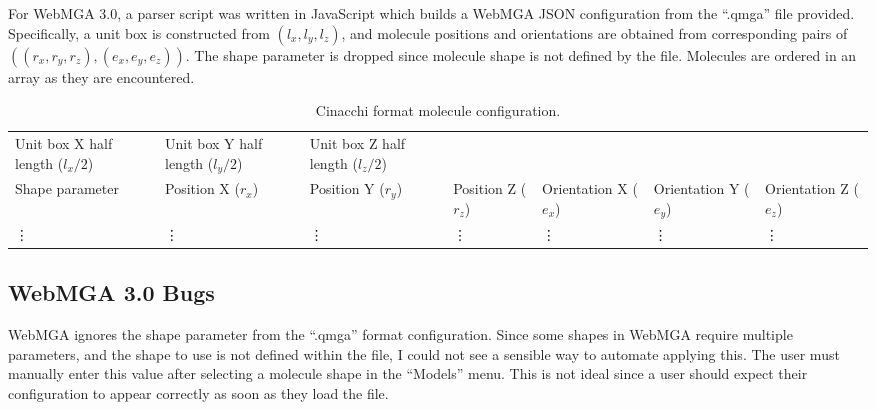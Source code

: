For WebMGA 3.0, a parser script was written in JavaScript which builds a WebMGA JSON configuration from the ``.qmga'' file provided. Specifically, a unit box is constructed from $(l_x, l_y, l_z)$, and molecule positions and orientations are obtained from corresponding pairs of $((r_x,r_y,r_z),(e_x,e_y,e_z))$. The shape parameter is dropped since molecule shape is not defined by the file. Molecules are ordered in an array as they are encountered.
\begin{table}
  \begin{center}
  \begin{adjustbox}{width=\textwidth}
    \begin{tabular}{lllllll}
      \hline\hline
       Unit box X half length ($l_x/2$) & Unit box Y half length ($l_y/2$) & Unit box Z half length ($l_z/2$) & & & &\\
       Shape parameter & Position X ($r_x$) & Position Y ($r_y$) & Position Z ($r_z$) & Orientation X ($e_x$) & Orientation Y ($e_y$) & Orientation Z ($e_z$)\\
       \vdots & \vdots & \vdots & \vdots & \vdots & \vdots & \vdots \\
       \hline\hline
    \end{tabular}
  \end{adjustbox}
  \end{center}
  \caption{Cinacchi format molecule configuration.}
  \label{tab:cinacchi_format}
\end{table}

\subsection{WebMGA 3.0 Bugs}
WebMGA ignores the shape parameter from the ``.qmga'' format configuration. Since some shapes in WebMGA require multiple parameters, and the shape to use is not defined within the file, I could not see a sensible way to automate applying this. The user must manually enter this value after selecting a molecule shape in the ``Models'' menu. This is not ideal since a user should expect their configuration to appear correctly as soon as they load the file.
